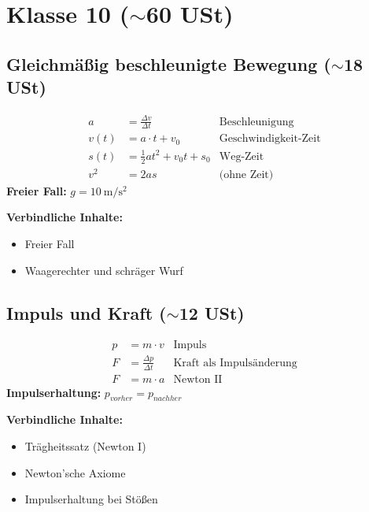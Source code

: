 \documentclass[11pt,a4paper]{article}
\begin{document}
\newpage
\section{Klasse 10 ($\sim$60 USt)}

\subsection{Gleichmäßig beschleunigte Bewegung ($\sim$18 USt)}

\begin{formelbox}
\begin{align*}
a &= \frac{\Delta v}{\Delta t} & \text{Beschleunigung} \\
v(t) &= a \cdot t + v_0 & \text{Geschwindigkeit-Zeit} \\
s(t) &= \frac{1}{2} a t^2 + v_0 t + s_0 & \text{Weg-Zeit} \\
v^2 &= 2 a s & \text{(ohne Zeit)}
\end{align*}
\textbf{Freier Fall:} $g = \SI{10}{\metre\per\second\squared}$
\end{formelbox}

\textbf{Verbindliche Inhalte:}
\begin{itemize}[leftmargin=0.5cm, itemsep=1pt]
\item Freier Fall
\item Waagerechter und schräger Wurf
\end{itemize}

\subsection{Impuls und Kraft ($\sim$12 USt)}

\begin{formelbox}
\begin{align*}
p &= m \cdot v & \text{Impuls} \\
F &= \frac{\Delta p}{\Delta t} & \text{Kraft als Impulsänderung} \\
F &= m \cdot a & \text{Newton II}
\end{align*}
\textbf{Impulserhaltung:} $p_{vorher} = p_{nachher}$
\end{formelbox}

\textbf{Verbindliche Inhalte:}
\begin{itemize}[leftmargin=0.5cm, itemsep=1pt]
\item Trägheitssatz (Newton I)
\item Newton'sche Axiome
\item Impulserhaltung bei Stößen
\end{itemize}
\end{document}
